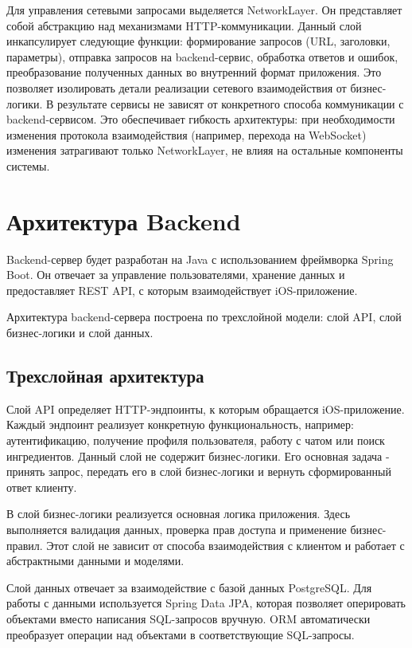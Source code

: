 Для управления сетевыми запросами выделяется NetworkLayer. Он представляет собой абстракцию над механизмами HTTP-коммуникации. Данный слой инкапсулирует следующие функции: формирование запросов (URL, заголовки, параметры), отправка запросов на backend-сервис, обработка ответов и ошибок, преобразование полученных данных во внутренний формат приложения. Это позволяет изолировать детали реализации сетевого взаимодействия от бизнес-логики. В результате сервисы не зависят от конкретного способа коммуникации с backend-сервисом. Это обеспечивает гибкость архитектуры: при необходимости изменения протокола взаимодействия (например, перехода на WebSocket) изменения затрагивают только NetworkLayer, не влияя на остальные компоненты системы.


\section{Архитектура Backend}


Backend-сервер будет разработан на Java с использованием фреймворка Spring Boot. Он отвечает за управление пользователями, хранение данных и предоставляет REST API, с которым взаимодействует iOS-приложение.


Архитектура backend-сервера построена по трехслойной модели: слой API, слой бизнес-логики и слой данных.


\subsection{Трехслойная архитектура}


Слой API определяет HTTP-эндпоинты, к которым обращается iOS-приложение. Каждый эндпоинт реализует конкретную функциональность, например: аутентификацию, получение профиля пользователя, работу с чатом или поиск ингредиентов. Данный слой не содержит бизнес-логики. Его основная задача - принять запрос, передать его в слой бизнес-логики и вернуть сформированный ответ клиенту.


В слой бизнес-логики реализуется основная логика приложения. Здесь выполняется валидация данных, проверка прав доступа и применение бизнес-правил. Этот слой не зависит от способа взаимодействия с клиентом и работает с абстрактными данными и моделями.


Слой данных отвечает за взаимодействие с базой данных PostgreSQL. Для работы с данными используется Spring Data JPA, которая позволяет оперировать объектами вместо написания SQL-запросов вручную. ORM автоматически преобразует операции над объектами в соответствующие SQL-запросы.


